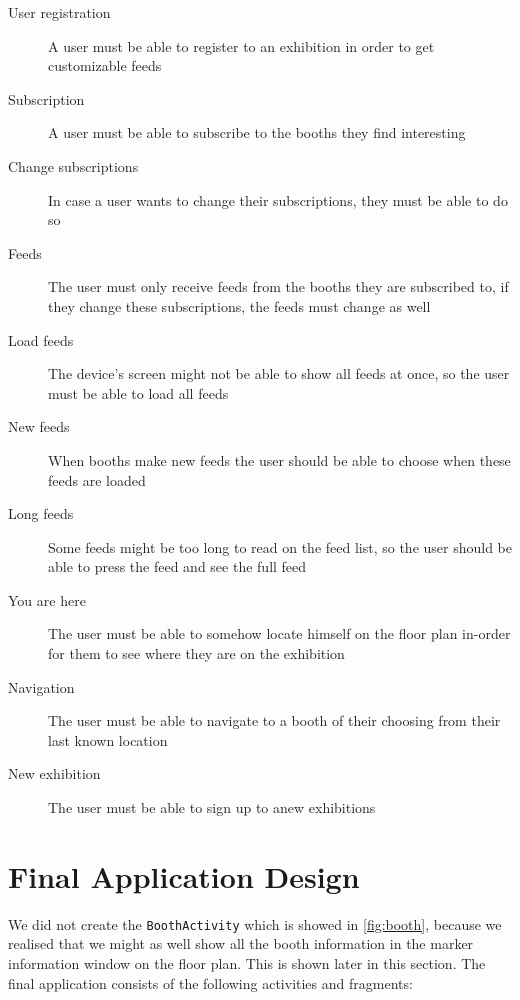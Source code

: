 \begin{description}
\item[User registration] A user must be able to register to an exhibition in order to get customizable feeds
\item[Subscription] A user must be able to subscribe to the booths they find interesting
\item[Change subscriptions] In case a user wants to change their subscriptions, they must be able to do so
\item[Feeds] The user must only receive feeds from the booths they are subscribed to, if they change these subscriptions, the feeds must change as well
\item[Load feeds] The device's screen might not be able to show all feeds at once, so the user must be able to load all feeds
\item[New feeds] When booths make new feeds the user should be able to choose when these feeds are loaded
\item[Long feeds] Some feeds might be too long to read on the feed list, so the user should be able to press the feed  and see the full feed
\item[You are here] The user must be able to somehow locate himself on the floor plan in-order for them to see where they are on the exhibition
\item[Navigation] The user must be able to navigate to a booth of their choosing from their last known location
\item[New exhibition] The user must be able to sign up to anew exhibitions 
\end{description}

\section{Final Application Design}\label{sec:finaldesign}

We did not create the \lstinline|BoothActivity| which is showed in \autoref{fig:booth}, because we realised that we might as well show all the booth information in the marker information window on the floor plan. This is shown later in this section. The final application consists of the following activities and fragments:

